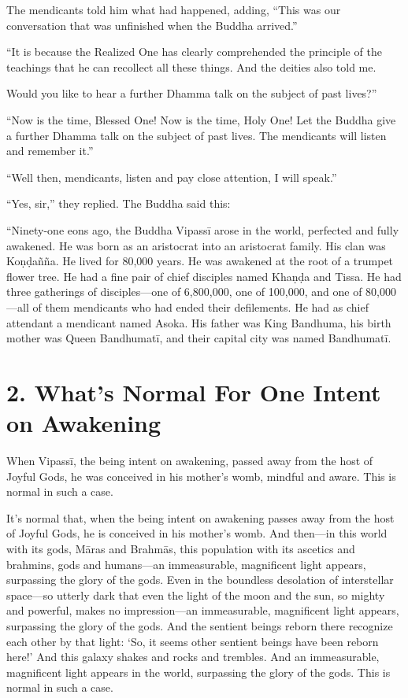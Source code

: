\documentclass[12pt,openany]{book}%
\begin{document}
The mendicants told him what had happened, adding, “This was our conversation that was unfinished when the Buddha arrived.” 

“It is because the Realized One has clearly comprehended the principle of the teachings that he can recollect all these things. And the deities also told me. 

Would you like to hear a further Dhamma talk on the subject of past lives?” 

“Now is the time, Blessed One! Now is the time, Holy One! Let the Buddha give a further Dhamma talk on the subject of past lives. The mendicants will listen and remember it.” 

“Well then, mendicants, listen and pay close attention, I will speak.” 

“Yes, sir,” they replied. The Buddha said this: 

“Ninety-one eons ago, the Buddha \textsanskrit{Vipassī} arose in the world, perfected and fully awakened. He was born as an aristocrat into an aristocrat family. His clan was \textsanskrit{Koṇḍañña}. He lived for 80,000 years. He was awakened at the root of a trumpet flower tree. He had a fine pair of chief disciples named \textsanskrit{Khaṇḍa} and Tissa. He had three gatherings of disciples—one of 6,800,000, one of 100,000, and one of 80,000—all of them mendicants who had ended their defilements. He had as chief attendant a mendicant named Asoka. His father was King Bandhuma, his birth mother was Queen \textsanskrit{Bandhumatī}, and their capital city was named \textsanskrit{Bandhumatī}. 

\section*{2. What’s Normal For One Intent on Awakening }

When \textsanskrit{Vipassī}, the being intent on awakening, passed away from the host of Joyful Gods, he was conceived in his mother’s womb, mindful and aware. This is normal in such a case. 

It’s normal that, when the being intent on awakening passes away from the host of Joyful Gods, he is conceived in his mother’s womb. And then—in this world with its gods, \textsanskrit{Māras} and \textsanskrit{Brahmās}, this population with its ascetics and brahmins, gods and humans—an immeasurable, magnificent light appears, surpassing the glory of the gods. Even in the boundless desolation of interstellar space—so utterly dark that even the light of the moon and the sun, so mighty and powerful, makes no impression—an immeasurable, magnificent light appears, surpassing the glory of the gods. And the sentient beings reborn there recognize each other by that light: ‘So, it seems other sentient beings have been reborn here!’ And this galaxy shakes and rocks and trembles. And an immeasurable, magnificent light appears in the world, surpassing the glory of the gods. This is normal in such a case. 
\end{document}
